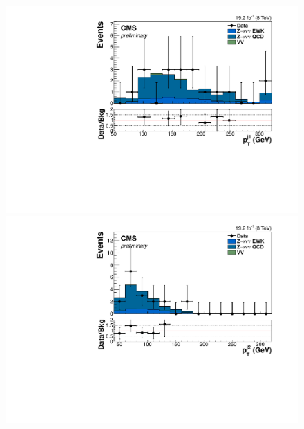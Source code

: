 \begin{figure}
  \includegraphics[width=.65\largefigwidth]{plots/parked/HIG-14-038-figs/output_sigreg/mumu_jet1_pt.pdf}
  \includegraphics[width=.65\largefigwidth]{plots/parked/HIG-14-038-figs/output_sigreg/mumu_jet2_pt.pdf}


\end{figure}
